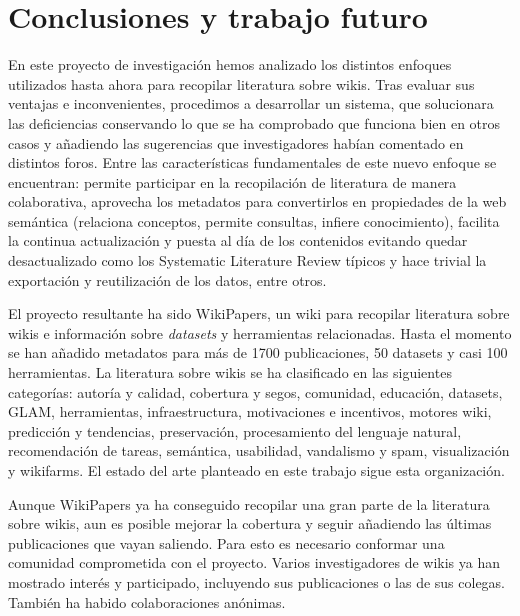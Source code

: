 \documentclass[11pt,onecolumn]{article}
\begin{document}
\clearpage

\section{Conclusiones y trabajo futuro}


En este proyecto de investigación hemos analizado los distintos enfoques utilizados hasta ahora para recopilar literatura sobre wikis. Tras evaluar sus ventajas e inconvenientes, procedimos a desarrollar un sistema, que solucionara las deficiencias conservando lo que se ha comprobado que funciona bien en otros casos y añadiendo las sugerencias que investigadores habían comentado en distintos foros. Entre las características fundamentales de este nuevo enfoque se encuentran: permite participar en la recopilación de literatura de manera colaborativa, aprovecha los metadatos para convertirlos en propiedades de la web semántica (relaciona conceptos, permite consultas, infiere conocimiento), facilita la continua actualización y puesta al día de los contenidos evitando quedar desactualizado como los Systematic Literature Review típicos y hace trivial la exportación y reutilización de los datos, entre otros.


El proyecto resultante ha sido WikiPapers, un wiki para recopilar literatura sobre wikis e información sobre \emph{datasets} y herramientas relacionadas. Hasta el momento se han añadido metadatos para más de 1700 publicaciones, 50 datasets y casi 100 herramientas. La literatura sobre wikis se ha clasificado en las siguientes categorías: autoría y calidad, cobertura y segos, comunidad, educación, datasets, GLAM, herramientas, infraestructura, motivaciones e incentivos, motores wiki, predicción y tendencias, preservación, procesamiento del lenguaje natural, recomendación de tareas, semántica, usabilidad, vandalismo y spam, visualización y wikifarms. El estado del arte planteado en este trabajo sigue esta organización.

Aunque WikiPapers ya ha conseguido recopilar una gran parte de la literatura sobre wikis, aun es posible mejorar la cobertura y seguir añadiendo las últimas publicaciones que vayan saliendo. Para esto es necesario conformar una comunidad comprometida con el proyecto. Varios investigadores de wikis ya han mostrado interés y participado, incluyendo sus publicaciones o las de sus colegas. También ha habido colaboraciones anónimas.
\end{document}
